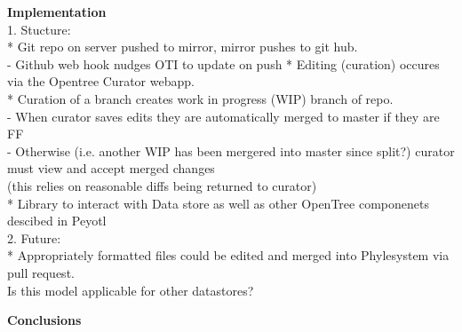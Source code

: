 \documentclass[a4paper,10pt]{article}
\begin{document}
        
\textbf{Implementation}\\

   1. Stucture:\\
       * Git repo on server pushed to mirror, mirror pushes to git hub.\\
           - Github web hook nudges OTI to update on push
       * Editing (curation) occures via the Opentree Curator webapp.\\
       * Curation of a branch creates work in progress (WIP) branch of repo.\\
          - When curator saves edits they are automatically merged to master if they are FF\\
          - Otherwise (i.e. another WIP has been mergered into master since split?) curator must view and accept merged changes\\
              (this relies on reasonable diffs being returned to curator)\\
       * Library to interact with Data store as well as other OpenTree componenets descibed in Peyotl\\
          
 
   2. Future:\\
       * Appropriately formatted files could be edited and merged into Phylesystem via pull request.\\
   

 
Is this model applicable for other datastores?


\textbf{Conclusions}\\
\end{document}
